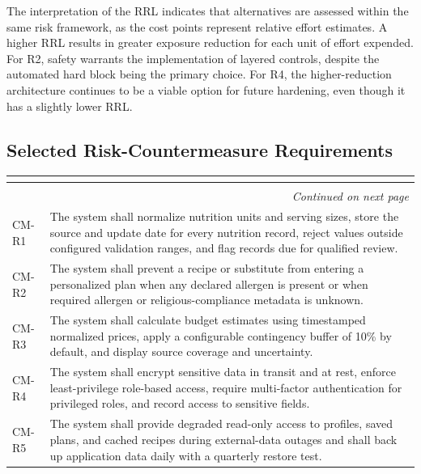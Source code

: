 \documentclass[11pt,a4paper]{article}
\renewcommand{\arraystretch}{1.15}
\begin{document}
The interpretation of the RRL indicates that alternatives are assessed within the same risk framework, as the cost points represent relative effort estimates. A higher RRL results in greater exposure reduction for each unit of effort expended. For R2, safety warrants the implementation of layered controls, despite the automated hard block being the primary choice. For R4, the higher-reduction architecture continues to be a viable option for future hardening, even though it has a slightly lower RRL.

\subsection{Selected Risk-Countermeasure Requirements}

\begin{center}
\small
\setlength{\tabcolsep}{2.5pt}
\renewcommand{\arraystretch}{1.18}
\begin{longtable}{|p{2.2cm}|p{13.8cm}|}
\hline
\rowcolor{headerblue} \textbf{\color{white}{Requirement ID}} & \textbf{\color{white}{Selected countermeasure requirement}} \\ \hline
\endfirsthead
\hline
\rowcolor{headerblue} \textbf{\color{white}{Requirement ID}} & \textbf{\color{white}{Selected countermeasure requirement}} \\ \hline
\endhead
\hline
\multicolumn{2}{r}{\small\itshape Continued on next page}\\
\endfoot
\hline
\endlastfoot
CM-R1 & The system shall normalize nutrition units and serving sizes, store the source and update date for every nutrition record, reject values outside configured validation ranges, and flag records due for qualified review. \\ \hline
CM-R2 & The system shall prevent a recipe or substitute from entering a personalized plan when any declared allergen is present or when required allergen or religious-compliance metadata is unknown. \\ \hline
CM-R3 & The system shall calculate budget estimates using timestamped normalized prices, apply a configurable contingency buffer of 10\% by default, and display source coverage and uncertainty. \\ \hline
CM-R4 & The system shall encrypt sensitive data in transit and at rest, enforce least-privilege role-based access, require multi-factor authentication for privileged roles, and record access to sensitive fields. \\ \hline
CM-R5 & The system shall provide degraded read-only access to profiles, saved plans, and cached recipes during external-data outages and shall back up application data daily with a quarterly restore test. \\ \hline

\end{longtable}
\end{center}
\end{document}
